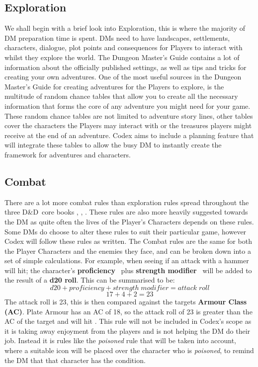 \documentclass[review]{cmpreport}
\newcommand{\dnd}{D\&D}
\begin{document}
	\subsection{Exploration}
	We shall begin with a brief look into Exploration, this is where the majority of DM preparation time is spent. DMs need to have landscapes, settlements, characters, dialogue, plot points and consequences for Players to interact with whilst they explore the world. The Dungeon Master's Guide \cite{DMGuide} contains a lot of information about the officially published settings, as well as tips and tricks for creating your own adventures. One of the most useful sources in the Dungeon Master's Guide for creating adventures for the Players to explore, is the multitude of random chance tables that allow you to create all the necessary information that forms the core of any adventure you might need for your game. These random chance tables are not limited to adventure story lines, other tables cover the characters the Players may interact with or the treasures players might receive at the end of an adventure. Codex aims to include a planning feature that will integrate these tables to allow the busy DM to instantly create the framework for adventures and characters. 
	
	\subsection{Combat}
	There are a lot more combat rules than exploration rules spread throughout the three \dnd \ core books \cite{DMGuide}, \cite{MonsterManual}, \cite{PlayerHandbook} . These rules are also more heavily suggested towards the DM as quite often the lives of the Player's Characters depends on these rules. Some DMs do choose to alter these rules to suit their particular game, however Codex will follow these rules as written. The Combat rules are the same for both the Player Characters and the enemies they face, and can be broken down into a set of simple calculations. For example, when seeing if an attack with a hammer will hit; the character's \textbf{proficiency} \ plus \textbf{strength modifier} \ will be added to the result of a \textbf{d20 roll}. This can be summarised to be:
	\clearpage
	\[
	d20 + proficiency + strength\;modifier = attack\;roll
	\]
	\[
	17 + 4 + 2 = 23
	\]
	The attack roll is 23, this is then compared against the targets \textbf{Armour Class (AC)}. Plate Armour has an AC of 18, so the attack roll of 23 is greater than the AC of the target and will hit \cite{PlayerHandbook}. This rule will not be included in Codex's scope as it is taking away enjoyment from the players and is not helping the DM do their job. Instead it is rules like the \emph{poisoned} rule that will be taken into account, where a suitable icon will be placed over the character who is \emph{poisoned}, to remind the DM that that character has the condition.
	
\end{document}
